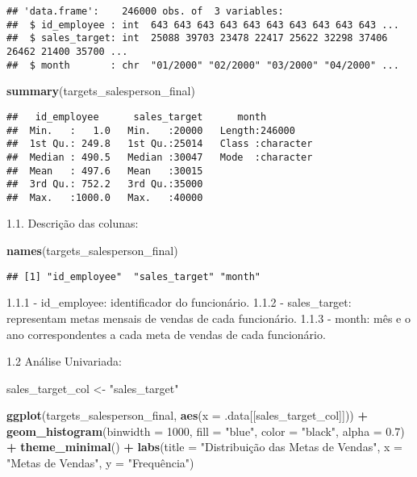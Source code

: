 \documentclass[
]{article}
\newenvironment{Shaded}{\begin{snugshade}}{\end{snugshade}}
\newcommand{\AttributeTok}[1]{\textcolor[rgb]{0.13,0.29,0.53}{#1}}
\newcommand{\DecValTok}[1]{\textcolor[rgb]{0.00,0.00,0.81}{#1}}
\newcommand{\FloatTok}[1]{\textcolor[rgb]{0.00,0.00,0.81}{#1}}
\newcommand{\FunctionTok}[1]{\textcolor[rgb]{0.13,0.29,0.53}{\textbf{#1}}}
\newcommand{\NormalTok}[1]{#1}
\newcommand{\OtherTok}[1]{\textcolor[rgb]{0.56,0.35,0.01}{#1}}
\newcommand{\SpecialCharTok}[1]{\textcolor[rgb]{0.81,0.36,0.00}{\textbf{#1}}}
\newcommand{\StringTok}[1]{\textcolor[rgb]{0.31,0.60,0.02}{#1}}
\begin{document}
\begin{verbatim}
## 'data.frame':    246000 obs. of  3 variables:
##  $ id_employee : int  643 643 643 643 643 643 643 643 643 643 ...
##  $ sales_target: int  25088 39703 23478 22417 25622 32298 37406 26462 21400 35700 ...
##  $ month       : chr  "01/2000" "02/2000" "03/2000" "04/2000" ...
\end{verbatim}

\begin{Shaded}
\begin{Highlighting}[]
\FunctionTok{summary}\NormalTok{(targets\_salesperson\_final)}
\end{Highlighting}
\end{Shaded}

\begin{verbatim}
##   id_employee      sales_target      month          
##  Min.   :   1.0   Min.   :20000   Length:246000     
##  1st Qu.: 249.8   1st Qu.:25014   Class :character  
##  Median : 490.5   Median :30047   Mode  :character  
##  Mean   : 497.6   Mean   :30015                     
##  3rd Qu.: 752.2   3rd Qu.:35000                     
##  Max.   :1000.0   Max.   :40000
\end{verbatim}

1.1. Descrição das colunas:

\begin{Shaded}
\begin{Highlighting}[]
\FunctionTok{names}\NormalTok{(targets\_salesperson\_final)}
\end{Highlighting}
\end{Shaded}

\begin{verbatim}
## [1] "id_employee"  "sales_target" "month"
\end{verbatim}

1.1.1 - id\_employee: identificador do funcionário. 1.1.2 -
sales\_target: representam metas mensais de vendas de cada funcionário.
1.1.3 - month: mês e o ano correspondentes a cada meta de vendas de cada
funcionário.

1.2 Análise Univariada:

\begin{Shaded}
\begin{Highlighting}[]
\NormalTok{sales\_target\_col }\OtherTok{\textless{}{-}} \StringTok{"sales\_target"}

\FunctionTok{ggplot}\NormalTok{(targets\_salesperson\_final, }\FunctionTok{aes}\NormalTok{(}\AttributeTok{x =}\NormalTok{ .data[[sales\_target\_col]])) }\SpecialCharTok{+}
  \FunctionTok{geom\_histogram}\NormalTok{(}\AttributeTok{binwidth =} \DecValTok{1000}\NormalTok{, }\AttributeTok{fill =} \StringTok{"blue"}\NormalTok{, }\AttributeTok{color =} \StringTok{"black"}\NormalTok{, }\AttributeTok{alpha =} \FloatTok{0.7}\NormalTok{) }\SpecialCharTok{+}
  \FunctionTok{theme\_minimal}\NormalTok{() }\SpecialCharTok{+}
  \FunctionTok{labs}\NormalTok{(}\AttributeTok{title =} \StringTok{"Distribuição das Metas de Vendas"}\NormalTok{, }\AttributeTok{x =} \StringTok{"Metas de Vendas"}\NormalTok{, }\AttributeTok{y =} \StringTok{"Frequência"}\NormalTok{)}
\end{Highlighting}
\end{Shaded}
\end{document}
